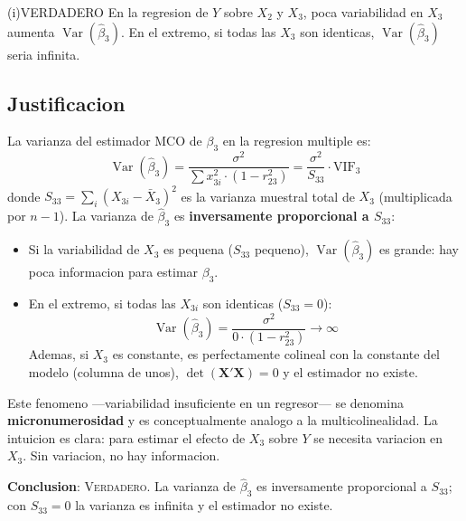 \documentclass[12pt, letterpaper]{article}
\theoremstyle{remark}
\newcommand{\Var}{\operatorname{Var}}
\begin{document}
\bigskip

\begin{verdict}{(i)}{VERDADERO}
  En la regresion de $Y$ sobre $X_2$ y $X_3$, poca variabilidad en $X_3$
  aumenta $\Var(\hat\beta_3)$. En el extremo, si todas las $X_3$ son
  identicas, $\Var(\hat\beta_3)$ seria infinita.
\end{verdict}

\subsection*{Justificacion}

La varianza del estimador MCO de $\beta_3$ en la regresion multiple es:
\begin{equation}
  \Var(\hat\beta_3)
    = \frac{\sigma^2}{\sum x_{3i}^2 \cdot (1 - r_{23}^2)}
    = \frac{\sigma^2}{S_{33}} \cdot \text{VIF}_3
  \label{eq:var_beta3}
\end{equation}
donde $S_{33} = \sum_i (X_{3i} - \bar X_3)^2$ es la varianza muestral
total de $X_3$ (multiplicada por $n-1$). La varianza de $\hat\beta_3$
es \textbf{inversamente proporcional a $S_{33}$}:

\begin{itemize}[leftmargin=1.6em, itemsep=3pt]
  \item Si la variabilidad de $X_3$ es pequena ($S_{33}$ pequeno),
    $\Var(\hat\beta_3)$ es grande: hay poca informacion para estimar $\beta_3$.
  \item En el extremo, si todas las $X_{3i}$ son identicas ($S_{33} = 0$):
    \begin{equation}
      \Var(\hat\beta_3) = \frac{\sigma^2}{0 \cdot (1-r_{23}^2)} \to \infty
      \label{eq:var_inf_x3}
    \end{equation}
    Ademas, si $X_3$ es constante, es perfectamente colineal con la
    constante del modelo (columna de unos), $\det(\mathbf{X'X}) = 0$
    y el estimador no existe.
\end{itemize}

Este fenomeno —variabilidad insuficiente en un regresor— se denomina
\textbf{micronumerosidad} y es conceptualmente analogo a la multicolinealidad.
La intuicion es clara: para estimar el efecto de $X_3$ sobre $Y$ se necesita
variacion en $X_3$. Sin variacion, no hay informacion.

\textbf{Conclusion}: \textsc{Verdadero}. La varianza de $\hat\beta_3$ es
inversamente proporcional a $S_{33}$; con $S_{33} = 0$ la varianza es infinita
y el estimador no existe.
\end{document}
